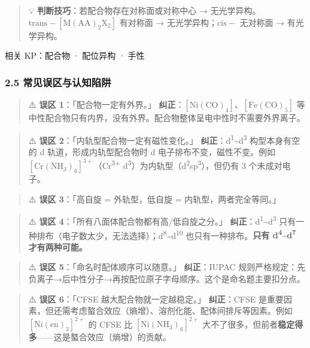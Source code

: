 \documentclass[a4paper,11pt]{ctexart}
\begin{document}
\begin{quote}
💡 \textbf{判断技巧}：若配合物存在对称面或对称中心 → 无光学异构。\(\mathrm{trans-[M(AA)_2X_2]}\) 有对称面 → 无光学异构；\(\mathrm{cis-}\) 无对称面 → 有光学异构。
\end{quote}

相关 KP：配合物 · 配位异构 · 手性

\subsubsection{2.5 常见误区与认知陷阱}\label{ux5e38ux89c1ux8befux533aux4e0eux8ba4ux77e5ux9677ux9631}

\begin{quote}
⚠️ \textbf{误区 1}：「配合物一定有外界。」
\textbf{纠正}：\(\mathrm{[Ni(CO)_4]}\)、\(\mathrm{[Fe(CO)_5]}\) 等中性配合物只有内界，没有外界。配合物整体呈电中性时不需要外界离子。
\end{quote}

\begin{quote}
⚠️ \textbf{误区 2}：「内轨型配合物一定有磁性变化。」
\textbf{纠正}：d\textsuperscript{1}\textasciitilde d\textsuperscript{3} 构型本身有空的 d 轨道，形成内轨型配合物时 d 电子排布不变，磁性不变。例如 \([\mathrm{Cr(NH_3)_6}]^{3+}\)（Cr\textsuperscript{3+} d\textsuperscript{3}）为内轨型（d\textsuperscript{2}sp\textsuperscript{3}），但仍有 3 个未成对电子。
\end{quote}

\begin{quote}
⚠️ \textbf{误区 3}：「高自旋 = 外轨型，低自旋 = 内轨型，两者完全等同。」
\end{quote}

\begin{quote}
⚠️ \textbf{误区 4}：「所有八面体配合物都有高/低自旋之分。」
\textbf{纠正}：d\textsuperscript{1}\textasciitilde d\textsuperscript{3} 只有一种排布（电子数太少，无法选择）；d\textsuperscript{8}\textasciitilde d\textsuperscript{10} 也只有一种排布。\textbf{只有 d\textsuperscript{4}\textasciitilde d\textsuperscript{7} 才有两种可能。}
\end{quote}

\begin{quote}
⚠️ \textbf{误区 5}：「命名时配体顺序可以随意。」
\textbf{纠正}：IUPAC 规则严格规定：先负离子→后中性分子→再按配位原子字母顺序。这个是命名题主要扣分点。
\end{quote}

\begin{quote}
⚠️ \textbf{误区 6}：「CFSE 越大配合物就一定越稳定。」
\textbf{纠正}：CFSE 是重要因素，但还需考虑螯合效应（熵增）、溶剂化能、配体间排斥等因素。例如 \([\mathrm{Ni(en)_3}]^{2+}\) 的 CFSE 比 \([\mathrm{Ni(NH_3)_6}]^{2+}\) 大不了很多，但前者\textbf{稳定得多}------这是螯合效应（熵增）的贡献。
\end{quote}
\end{document}
